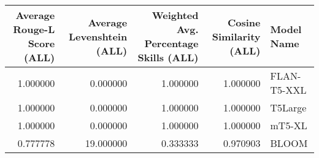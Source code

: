 \begin{tabular}{rrrrl}
\toprule
Average Rouge-L Score (ALL) & Average Levenshtein (ALL) & Weighted Avg. Percentage Skills (ALL) & Cosine Similarity (ALL) & Model Name \\
\midrule
1.000000 & 0.000000 & 1.000000 & 1.000000 & FLAN-T5-XXL \\
1.000000 & 0.000000 & 1.000000 & 1.000000 & T5Large \\
1.000000 & 0.000000 & 1.000000 & 1.000000 & mT5-XL \\
0.777778 & 19.000000 & 0.333333 & 0.970903 & BLOOM \\
\bottomrule
\end{tabular}
